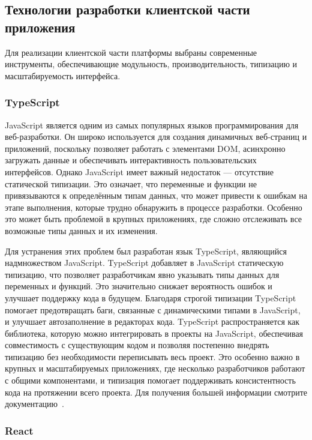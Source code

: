 \subsection{Технологии разработки клиентской части приложения}

Для реализации клиентской части платформы выбраны современные инструменты, обеспечивающие модульность, производительность, типизацию и масштабируемость интерфейса.

\subsubsection{TypeScript}
JavaScript является одним из самых популярных языков программирования для веб-разработки. Он широко используется для создания динамичных веб-страниц и приложений, поскольку позволяет работать с элементами DOM, асинхронно загружать данные и обеспечивать интерактивность пользовательских интерфейсов. Однако JavaScript имеет важный недостаток — отсутствие статической типизации. Это означает, что переменные и функции не привязываются к определённым типам данных, что может привести к ошибкам на этапе выполнения, которые трудно обнаружить в процессе разработки. Особенно это может быть проблемой в крупных приложениях, где сложно отслеживать все возможные типы данных и их изменения.

Для устранения этих проблем был разработан язык TypeScript, являющийся надмножеством JavaScript. TypeScript добавляет в JavaScript статическую типизацию, что позволяет разработчикам явно указывать типы данных для переменных и функций. Это значительно снижает вероятность ошибок и улучшает поддержку кода в будущем. Благодаря строгой типизации TypeScript помогает предотвращать баги, связанные с динамическими типами в JavaScript, и улучшает автозаполнение в редакторах кода. TypeScript распространяется как библиотека, которую можно интегрировать в проекты на JavaScript, обеспечивая совместимость с существующим кодом и позволяя постепенно внедрять типизацию без необходимости переписывать весь проект. Это особенно важно в крупных и масштабируемых приложениях, где несколько разработчиков работают с общими компонентами, и типизация помогает поддерживать консистентность кода на протяжении всего проекта. Для получения большей информации смотрите документацию~\cite{typescript_handbook}.

\subsubsection{React}

